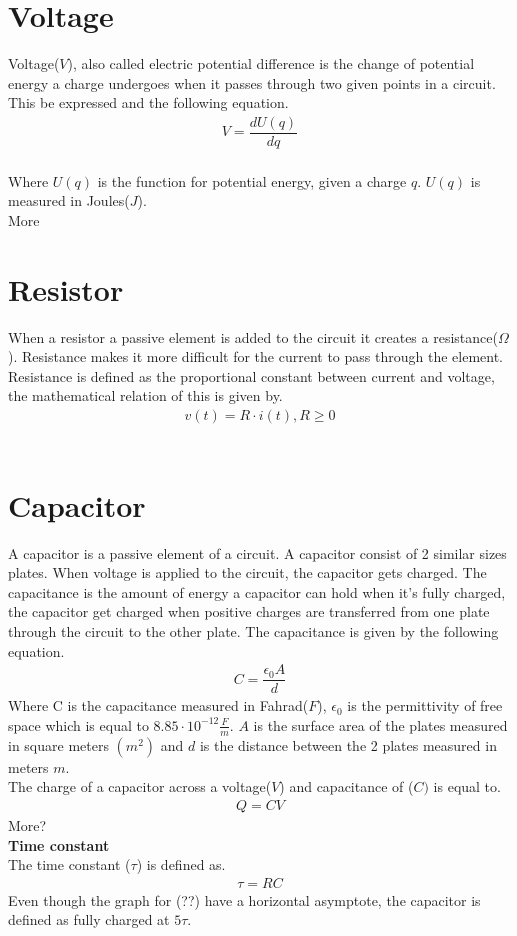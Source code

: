 \section{Voltage}
Voltage($V$), also called electric potential difference is the change of potential energy a charge undergoes when it passes through two given points in a circuit. This be expressed and the following equation.
\begin{align}
V=\dfrac{dU(q)}{dq}
\end{align}
\\
Where $U(q)$ is the function for potential energy, given a charge $q$. $U(q)$ is measured in Joules($J$).
\\
More
\\
\section{Resistor}
When a resistor a passive element is added to the circuit it creates a resistance($\Omega$). Resistance makes it more difficult for the current to pass through the element. Resistance is defined as the proportional constant between current and voltage, the mathematical relation of this is given by.
\begin{align}
v(t)=R\cdot i(t),  R\geq0
\end{align}
\\
\section{Capacitor}
A capacitor is a passive element of a circuit. A capacitor consist of 2 similar sizes plates. When voltage is applied to the circuit, the capacitor gets charged. The capacitance is the amount of energy a capacitor can hold when it's fully charged, the capacitor get charged when positive charges are transferred from one plate through the circuit to the other plate. The capacitance is given by the following equation.\
\begin{align}
C=\dfrac{\epsilon_{0}A}{d}
\end{align}
Where C is the capacitance measured in Fahrad($F$), $\epsilon_{0}$ is the permittivity of free space which is equal to $8.85 \cdot 10^{-12}                                                 \frac{F}{m}$. $A$ is the surface area of the plates measured in square meters $(m^{2})$ and $d$ is the distance between the 2 plates measured in meters $m$.
\\
The charge of a capacitor across a voltage($V$) and capacitance of ($C)$ is equal to.
\begin{align}
Q=CV	
\end{align}
More?
\\
\textbf{Time constant}
\\
The time constant ($\tau$) is defined as.
\begin{align}
\tau = RC
\end{align}
Even though the graph for (??) have a horizontal asymptote, the capacitor is defined as fully charged at $5\tau$.

